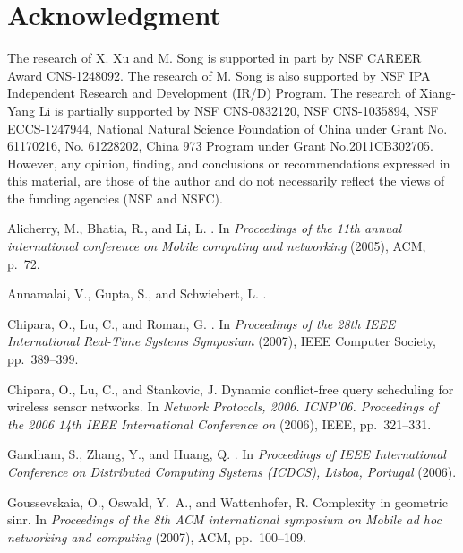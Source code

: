 \documentclass[conference,10pt]{IEEEtran}\usepackage{amsmath}
\begin{document}
\section*{Acknowledgment}
The research of X. Xu and M. Song is supported in part by NSF CAREER Award CNS-1248092.
The research of M. Song is also supported by NSF IPA Independent Research and Development (IR/D) Program.
The research of Xiang-Yang Li
  is partially supported by NSF CNS-0832120, NSF CNS-1035894, NSF ECCS-1247944,
  National Natural Science Foundation of China under Grant No. 61170216, No. 61228202, China 973 Program under Grant No.2011CB302705.
However, any opinion, finding, and conclusions or recommendations expressed in this
material, are those of the author and do not necessarily reflect the views of
the funding agencies (NSF and NSFC).
\begin{thebibliography}{10}

{\sc Alicherry, M., Bhatia, R., and Li, L.}
.
\newblock In {\em Proceedings of the 11th annual international conference on
  Mobile computing and networking\/} (2005), ACM, p.~72.

{\sc Annamalai, V., Gupta, S., and Schwiebert, L.}
.

{\sc Chipara, O., Lu, C., and Roman, G.}
.
\newblock In {\em Proceedings of the 28th IEEE International Real-Time Systems
  Symposium\/} (2007), IEEE Computer Society, pp.~389--399.

{\sc Chipara, O., Lu, C., and Stankovic, J.}
\newblock Dynamic conflict-free query scheduling for wireless sensor networks.
\newblock In {\em Network Protocols, 2006. ICNP'06. Proceedings of the 2006
  14th IEEE International Conference on\/} (2006), IEEE, pp.~321--331.

{\sc Gandham, S., Zhang, Y., and Huang, Q.}
.
\newblock In {\em Proceedings of IEEE International Conference on Distributed
  Computing Systems (ICDCS), Lisboa, Portugal\/} (2006).

{\sc Goussevskaia, O., Oswald, Y.~A., and Wattenhofer, R.}
\newblock Complexity in geometric sinr.
\newblock In {\em Proceedings of the 8th ACM international symposium on Mobile
  ad hoc networking and computing\/} (2007), ACM, pp.~100--109.


\end{thebibliography}
\end{document}
